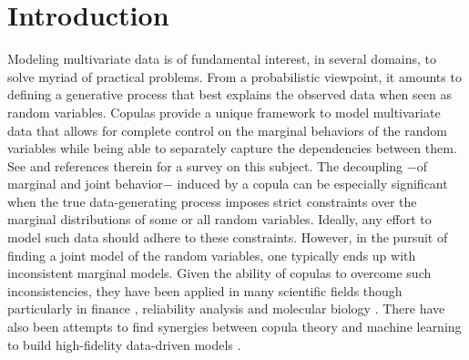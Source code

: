 \documentclass{article}
\theoremstyle{plain}
\theoremstyle{definition}
\theoremstyle{remark}
\begin{document}
 


 


\section{Introduction}\label{sec:Intro}

Modeling multivariate data is of fundamental interest, in several domains, to solve myriad of practical problems. From a probabilistic viewpoint, it amounts to defining a generative process that best explains the observed data when seen as random variables. Copulas provide a unique framework to model multivariate data that allows for complete control on the marginal behaviors of the random variables while being able to separately capture the dependencies between them. See \citep{Durante2010CopulaIntro} and references therein for a survey on this subject.  The decoupling $-$of marginal and joint behavior$-$ induced by a copula can be especially significant when the true data-generating process imposes strict constraints over the marginal distributions of some or all random variables. Ideally, any effort to model such data should adhere to these constraints. However, in the pursuit of finding a joint model of the random variables, one typically ends up with inconsistent marginal models.  Given the ability of copulas to overcome such inconsistencies, they have been applied in many scientific fields though particularly in finance \citep{Genest2009CopulaInFinance,Cherubini2004copula}, reliability analysis \citep{Rychlik2010Reliability} and molecular biology \citep{Bilgrau2012quantification,Li2011,Kim2008,Ma2012Gini}.  There have also been  attempts to find synergies between copula theory and machine learning to build high-fidelity data-driven models \citep[see][for a survey on the applications of copulas in machine learning approaches]{Elidan2013}.
\end{document}
